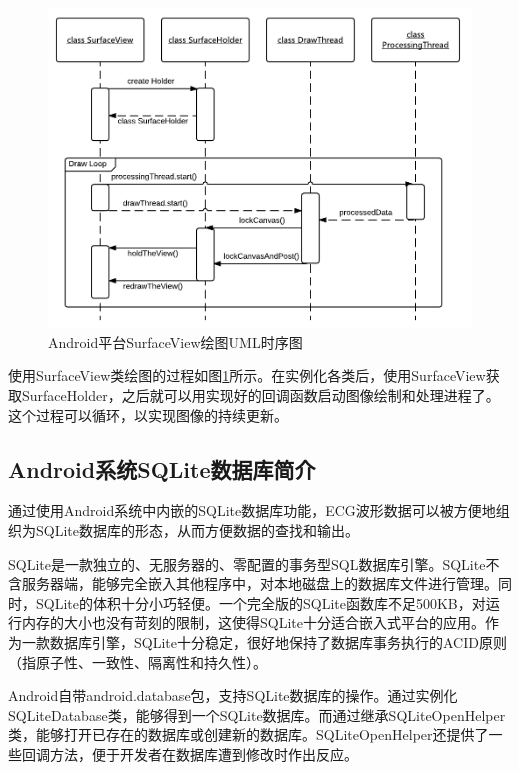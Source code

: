 \begin{figure}[htbp]
 \centering
        \includegraphics[width=0.9\columnwidth]{fig2-3.png}
        \caption{
                \label{fig2-3}
                Android平台SurfaceView绘图UML时序图
        }
\end{figure}

使用SurfaceView类绘图的过程如图\ref{fig2-3}所示。在实例化各类后，使用SurfaceView获取SurfaceHolder，之后就可以用实现好的回调函数启动图像绘制和处理进程了。这个过程可以循环，以实现图像的持续更新。

\subsection{Android系统SQLite数据库简介}

通过使用Android系统中内嵌的SQLite数据库功能，ECG波形数据可以被方便地组织为SQLite数据库的形态，从而方便数据的查找和输出。

SQLite是一款独立的、无服务器的、零配置的事务型SQL数据库引擎\cite{the_sqlite_development_team_about_????}。SQLite不含服务器端，能够完全嵌入其他程序中，对本地磁盘上的数据库文件进行管理。同时，SQLite的体积十分小巧轻便。一个完全版的SQLite函数库不足500KB，对运行内存的大小也没有苛刻的限制，这使得SQLite十分适合嵌入式平台的应用。作为一款数据库引擎，SQLite十分稳定，很好地保持了数据库事务执行的ACID原则（指原子性、一致性、隔离性和持久性）。

Android自带android.database包，支持SQLite数据库的操作。通过实例化SQLiteDatabase类，能够得到一个SQLite数据库。而通过继承SQLiteOpenHelper类，能够打开已存在的数据库或创建新的数据库。SQLiteOpenHelper还提供了一些回调方法，便于开发者在数据库遭到修改时作出反应。

